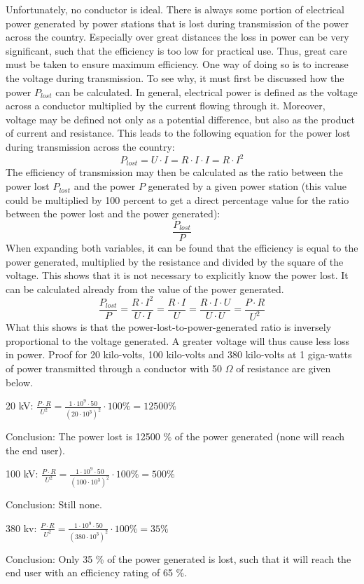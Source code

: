 
Unfortunately, no conductor is ideal. There is always some portion of electrical power generated by power stations that is lost during transmission of the power across the country. Especially over great distances the loss in power can be very significant, such that the efficiency is too low for practical use. Thus, great care must be taken to ensure maximum efficiency. One way of doing so is to increase the voltage during transmission. To see why, it must first be discussed how the power $P_{lost}$ can be calculated. In general, electrical power is defined as the voltage across a conductor multiplied by the current flowing through it. Moreover, voltage may be defined not only as a potential difference, but also as the product of current and resistance. This leads to the following equation for the power lost during transmission across the country: $$P_{lost} = U \cdot I = R \cdot I \cdot I = R \cdot I^2$$ The efficiency of transmission may then be calculated as the ratio between the power lost $P_{lost}$ and the power $P$ generated by a given power station (this value could be multiplied by 100 percent to get a direct percentage value for the ratio between the power lost and the power generated): $$\frac{P_{lost}}{P}$$ When expanding both variables, it can be found that the efficiency is equal to the power generated, multiplied by the resistance and divided by the square of the voltage. This shows that it is not necessary to explicitly know the power lost. It can be calculated already from the value of the power generated. $$\frac{P_{lost}}{P} = \frac{R \cdot I^2}{U \cdot I} = \frac{R \cdot I}{U} = \frac{R \cdot I \cdot U}{U \cdot U} = \frac{P \cdot R}{U^2}$$ What this shows is that the power-lost-to-power-generated ratio is inversely proportional to the voltage generated. A greater voltage will thus cause less loss in power. Proof for 20 kilo-volts, 100 kilo-volts and 380 kilo-volts at 1 giga-watts of power transmitted through a conductor with 50 $\Omega$ of resistance are given below.

20 kV: $\frac{P \cdot R}{U^2} = \frac{1 \cdot 10^9 \cdot 50}{(20 \cdot 10^3)^2} \cdot 100\% = 12500 \%$ 

Conclusion: The power lost is 12500 \% of the power generated (none will reach the end user).

100 kV: $\frac{P \cdot R}{U^2} = \frac{1 \cdot 10^9 \cdot 50}{(100 \cdot 10^3)^2} \cdot 100\% = 500 \%$

Conclusion: Still none.

380 kv: $\frac{P \cdot R}{U^2} = \frac{1 \cdot 10^9 \cdot 50}{(380 \cdot 10^3)^2} \cdot 100\% = 35 \%$ 

Conclusion: Only 35 \% of the power generated is lost, such that it will reach the end user with an efficiency rating of 65 \%.

